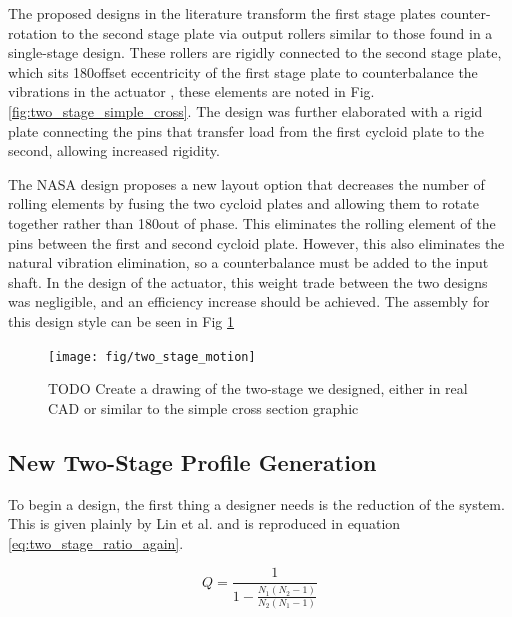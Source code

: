 The proposed designs in the literature transform the first stage plates counter-rotation to the second stage plate via output rollers similar to those found in a single-stage design. These rollers are rigidly connected to the second stage plate, which sits 180\textdegree offset eccentricity of the first stage plate to counterbalance the vibrations in the actuator \cite{ref:new_two_stage}, these elements are noted in Fig. \ref{fig:two_stage_simple_cross}. The design was further elaborated with a rigid plate connecting the pins that transfer load from the first cycloid plate to the second, allowing increased rigidity. 

The NASA design proposes a new layout option that decreases the number of rolling elements by fusing the two cycloid plates and allowing them to rotate together rather than 180\textdegree out of phase. This eliminates the rolling element of the pins between the first and second cycloid plate. However, this also eliminates the natural vibration elimination, so a counterbalance must be added to the input shaft. In the design of the actuator, this weight trade between the two designs was negligible, and an efficiency increase should be achieved. The assembly for this design style can be seen in Fig \ref{fig:two_stage_design} 

\begin{figure}[h]
	\centering
	\texttt{[image: fig/two\_stage\_motion]}
   \caption{TODO Create a drawing of the two-stage we designed, either in real CAD or similar to the simple cross section graphic}
   \label{fig:two_stage_design}
\end{figure}


\subsection{New Two-Stage Profile Generation} \label{ch:dual:initial_equation:profiles}

To begin a design, the first thing a designer needs is the reduction of the system. This is given plainly by Lin et al. and is reproduced in equation \ref{eq:two_stage_ratio_again}.

\begin{equation} \label{eq:two_stage_ratio_again}
Q = \frac{1}{1 - \frac{N_1 (N_2-1)}{N_2 (N_1-1)}}
\end{equation}

